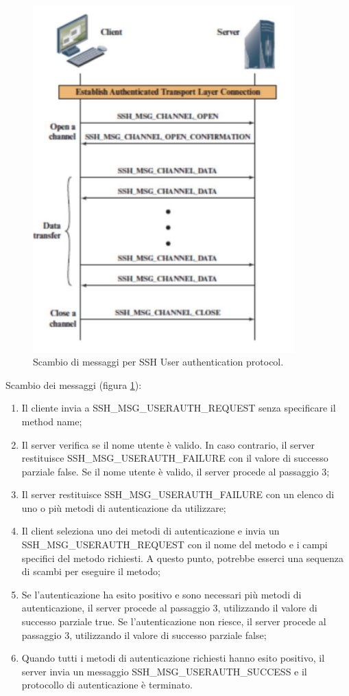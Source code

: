 \begin{figure}
    \centering
    \includegraphics[width=0.9\textwidth]{images/chapter5/5-5.png}
    \caption{Scambio di messaggi per SSH User authentication protocol.}
    \label{fig:5-5}
\end{figure}

Scambio dei messaggi (figura \ref{fig:5-5}):
\begin{enumerate}
    \item Il cliente invia a SSH\_MSG\_USERAUTH\_REQUEST senza specificare il method name;
	\item Il server verifica se il nome utente è valido. In caso contrario, il server restituisce SSH\_MSG\_USERAUTH\_FAILURE con il valore di successo parziale false. Se il nome utente è valido, il server procede al passaggio 3;
	\item Il server restituisce SSH\_MSG\_USERAUTH\_FAILURE con un elenco di uno o più metodi di autenticazione da utilizzare;
	\item Il client seleziona uno dei metodi di autenticazione e invia un SSH\_MSG\_USERAUTH\_REQUEST con il nome del metodo e i campi specifici del metodo richiesti. A questo punto, potrebbe esserci una sequenza di scambi per eseguire il metodo;
	\item Se l'autenticazione ha esito positivo e sono necessari più metodi di autenticazione, il server procede al passaggio 3, utilizzando il valore di successo parziale true. Se l'autenticazione non riesce, il server procede al passaggio 3, utilizzando il valore di successo parziale false;
	\item Quando tutti i metodi di autenticazione richiesti hanno esito positivo, il server invia un messaggio SSH\_MSG\_USERAUTH\_SUCCESS e il protocollo di autenticazione è terminato.
\end{enumerate}

